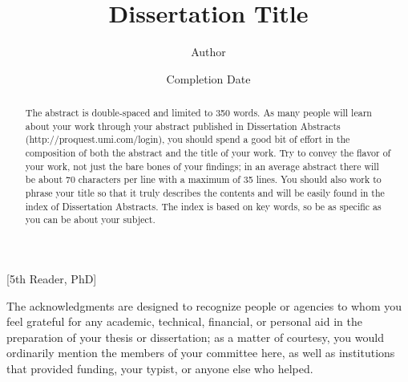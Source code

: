 \documentclass{iuphd}
\begin{document}
\title{Dissertation Title}
\author{Author}
\date{Completion Date}
\maketitle

[5th Reader, PhD]%
\acceptancepage



\begin{acknowledgments}
The acknowledgments are designed to recognize people or agencies to whom you feel grateful for any academic,
technical, financial, or personal aid in the preparation of your thesis or dissertation; as a matter of
courtesy, you would ordinarily mention the members of your committee here, as well as institutions that
provided funding, your typist, or anyone else who helped.
\end{acknowledgments}


\begin{abstract}
 The abstract is double-spaced and limited to 350 words. As many people will learn about
your work through your abstract published in Dissertation Abstracts (http://proquest.umi.com/login),
you should spend a good bit of effort in the composition of both the abstract and the title of your work.
Try to convey the flavor of your work, not just the bare bones of your findings; in an average abstract
there will be about 70 characters per line with a maximum of 35 lines. You should also work to phrase your
title so that it truly describes the contents and will be easily found in the index of Dissertation Abstracts.
The index is based on key words, so be as specific as you can be about your subject. 
\end{abstract}

\tableofcontents






% 
% 
\end{document}

